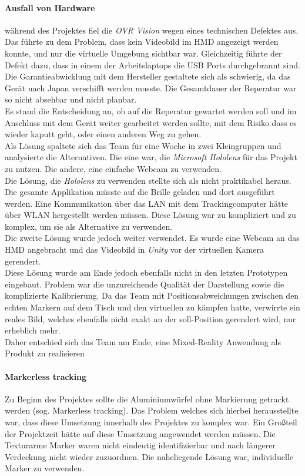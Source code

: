 \paragraph{Ausfall von Hardware} während des Projektes fiel die \textit{OVR Vision} wegen eines technischen Defektes aus. Das führte zu dem Problem, dass kein Videobild im HMD angezeigt werden konnte, und nur die virtuelle Umgebung sichtbar war. Gleichzeitig führte der Defekt dazu, dass in einem der Arbeitslaptops die USB Ports durchgebrannt sind. Die Garantieabwicklung mit dem Hersteller gestaltete sich als schwierig, da das Gerät nach Japan verschifft werden musste. Die Gesamtdauer der Reperatur war so nicht absehbar und nicht planbar. \\
Es stand die Entscheidung an, ob auf die Reperatur gewartet werden soll und im Anschluss mit dem Gerät weiter gearbeitet werden sollte, mit dem Risiko dass es wieder kaputt geht, oder einen anderen Weg zu gehen.\\
Als Lösung spaltete sich das Team für eine Woche in zwei Kleingruppen und analysierte die Alternativen. Die eine war, die \textit{Microsoft Hololens} für das Projekt zu nutzen. Die andere, eine einfache Webcam zu verwenden.\\
Die Lösung, die \textit{Hololens} zu verwenden stellte sich als nicht praktikabel heraus. Die gesamte Applikation müsste auf die Brille geladen und dort ausgeführt werden. Eine Kommunikation über das LAN mit dem Trackingcomputer hätte über WLAN hergestellt werden müssen. Diese Lösung war zu kompliziert und zu komplex, um sie als Alternative zu verwenden.\\
Die zweite Lösung wurde jedoch weiter verwendet. Es wurde eine Webcam an das HMD angebracht und das Videobild in \textit{Unity} vor der virtuellen Kamera gerendert.\\
Diese Lösung wurde am Ende jedoch ebenfalls nicht in den letzten Prototypen eingebaut. Problem war die unzureichende Qualität der Darstellung sowie die komplizierte Kalibrierung. Da das Team mit Positionsabweichungen zwischen den echten Markern auf dem Tisch und den virtuellen zu kämpfen hatte, verwirrte ein reales Bild, welches ebenfalls nicht exakt an der soll-Position gerendert wird, nur erheblich mehr.\\
Daher entschied sich das Team am Ende, eine Mixed-Reality Anwendung als Produkt zu realisieren 


\paragraph{Markerless tracking}
 Zu Beginn des Projektes sollte die Aluminiumwürfel ohne Markierung getrackt werden (sog. Markerless tracking). Das Problem welches sich hierbei herausstellte war, dass diese Umsetzung innerhalb des Projektes zu komplex war. Ein Großteil der Projektzeit hätte auf diese Umsetzung angewendet werden müssen. Die Texturarme Marker waren nicht eindeutig identifizierbar und nach längerer Verdeckung nicht wieder zuzuordnen. Die naheliegende Lösung war, individuelle Marker zu verwenden.


